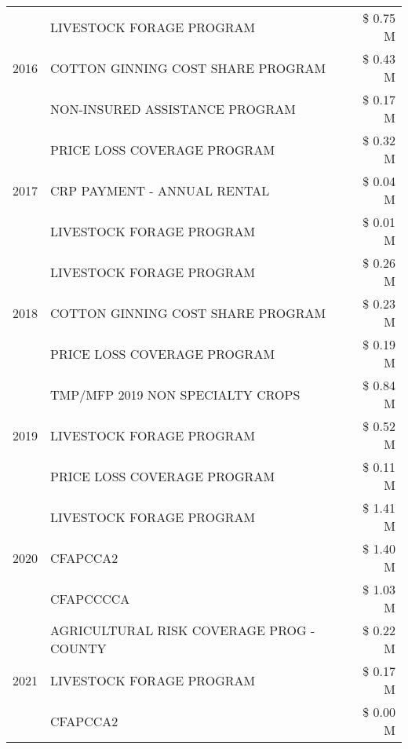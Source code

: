 \begin{tabular}{llr}
\cline{1-3}
\multirow[t]{3}{*}{2016} & LIVESTOCK FORAGE PROGRAM & \$ 0.75 M \\
 & COTTON GINNING COST SHARE PROGRAM & \$ 0.43 M \\
 & NON-INSURED ASSISTANCE PROGRAM & \$ 0.17 M \\
\cline{1-3}
\multirow[t]{3}{*}{2017} & PRICE LOSS COVERAGE PROGRAM & \$ 0.32 M \\
 & CRP PAYMENT - ANNUAL RENTAL & \$ 0.04 M \\
 & LIVESTOCK FORAGE PROGRAM & \$ 0.01 M \\
\cline{1-3}
\multirow[t]{3}{*}{2018} & LIVESTOCK FORAGE PROGRAM & \$ 0.26 M \\
 & COTTON GINNING COST SHARE PROGRAM & \$ 0.23 M \\
 & PRICE LOSS COVERAGE PROGRAM & \$ 0.19 M \\
\cline{1-3}
\multirow[t]{3}{*}{2019} & TMP/MFP 2019 NON SPECIALTY CROPS & \$ 0.84 M \\
 & LIVESTOCK FORAGE PROGRAM & \$ 0.52 M \\
 & PRICE LOSS COVERAGE PROGRAM & \$ 0.11 M \\
\cline{1-3}
\multirow[t]{3}{*}{2020} & LIVESTOCK FORAGE PROGRAM & \$ 1.41 M \\
 & CFAPCCA2 & \$ 1.40 M \\
 & CFAPCCCCA & \$ 1.03 M \\
\cline{1-3}
\multirow[t]{3}{*}{2021} & AGRICULTURAL RISK COVERAGE PROG - COUNTY & \$ 0.22 M \\
 & LIVESTOCK FORAGE PROGRAM & \$ 0.17 M \\
 & CFAPCCA2 & \$ 0.00 M \\
\cline{1-3}
\bottomrule
\end{tabular}
